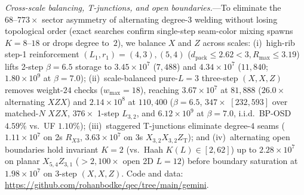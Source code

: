 \documentclass[aps,prx,reprint,superscriptaddress,nofootinbib,floatfix]{revtex4-2}
\begin{document}
\emph{Cross-scale balancing, T-junctions, and open boundaries.}---To eliminate the $68\text{--}773\times$ sector asymmetry of alternating degree-$3$ welding without losing topological order (exact searches confirm single-step seam-color mixing spawns $K = 8\text{--}18$ or drops degree to~$2$), we balance $X$ and $Z$ across scales: (i)~high-rib step-1 reinforcement $(L_1, r_1) = (4, 3), (5, 4)$ ($d_{\mathrm{pack}} \le 2.62 < 3, R_{\max} \le 3.19$) lifts 2-step $\beta = 6.5$ storage to $3.45 \times 10^7$ ($7{,}488$) and $4.34 \times 10^7$ ($11{,}840$; $1.80 \times 10^9$ at $\beta = 7.0$); (ii)~scale-balanced pure-$L = 3$ three-step $(X, X, Z)$ removes weight-$24$ checks ($w_{\max} = 18$), reaching $3.67 \times 10^7$ at $81{,}888$ ($26.0\times$ alternating $XZX$) and $2.14 \times 10^8$ at $110{,}400$ ($\beta = 6.5$, $347\times$ $[232, 593]$ over matched-$N$ $XZX$, $376\times$ 1-step $L_{3,2}$, and $6.12 \times 10^9$ at $\beta = 7.0$, i.i.d.\ BP-OSD $4.59\%$ vs.\ UF $1.10\%$); (iii)~staggered T-junctions eliminate degree-$4$ seams ($1.11 \times 10^7$ on 2s $R_{X3}$, $3.63 \times 10^7$ on 3s $X_{3,2} X_{3,2} Z_{\mathrm{T}}$); and (iv)~alternating open boundaries hold invariant $K = 2$ (vs.\ Haah $K(L) \in [2, 62]$) up to $2.28 \times 10^7$ on planar $X_{5,4} Z_{3,1}$ ($>2{,}100\times$ open 2D $L = 12$) before boundary saturation at $1.98 \times 10^7$ on 3-step $(X, X, Z)$. Code and data: \url{https://github.com/rohanbodke/qec/tree/main/gemini}.



\end{document}
